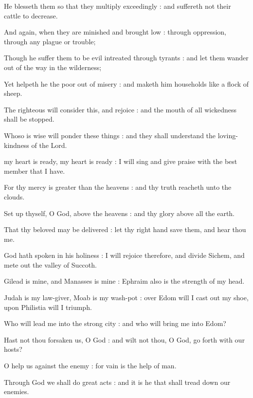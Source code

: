 He blesseth them so that they multiply exceedingly : and suffereth not their cattle to decrease.\par
{}And again, when they are minished and brought low : through oppression, through any plague or trouble;\par
{}Though he suffer them to be evil intreated through tyrants : and let them wander out of the way in the wilderness;\par
{}Yet helpeth he the poor out of misery : and maketh him households like a flock of sheep.\par
{}The righteous will consider this, and rejoice : and the mouth of all wickedness shall be stopped.\par
{}Whoso is wise will ponder these things : and they shall understand the loving-kindness of the Lord.\par



 my heart is ready, my heart is ready : I will sing and give praise with the best member that I have.\par
{}
For thy mercy is greater than the heavens : and thy truth reacheth unto the clouds.\par
{}Set up thyself, O God, above the heavens : and thy glory above all the earth.\par
{}That thy beloved may be delivered : let thy right hand save them, and hear thou me.\par
{}God hath spoken in his holiness : I will rejoice therefore, and divide Sichem, and mete out the valley of Succoth.\par
{}Gilead is mine, and Manasses is mine : Ephraim also is the strength of my head.\par
{}Judah is my law-giver, Moab is my wash-pot : over Edom will I cast out my shoe, upon Philistia will I triumph.\par
{}Who will lead me into the strong city : and who will bring me into Edom?\par
{}Hast not thou forsaken us, O God : and wilt not thou, O God, go forth with our hosts?\par
{}O help us against the enemy : for vain is the help of man.\par
{}Through God we shall do great acts : and it is he that shall tread down our enemies.\par

